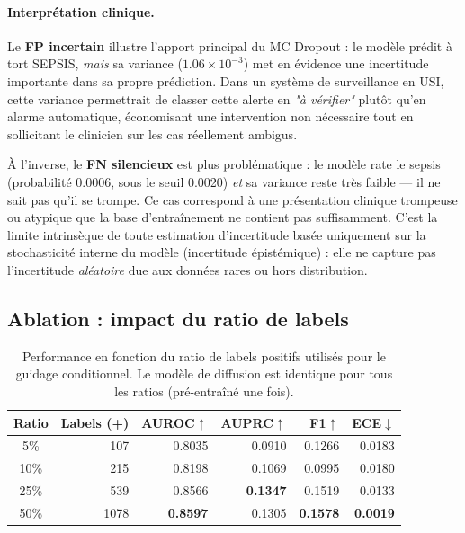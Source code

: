 \documentclass[11pt,a4paper]{article}
\begin{document}
\paragraph{Interprétation clinique.}
Le \textbf{FP incertain} illustre l'apport principal du MC Dropout : le modèle
prédit à tort SEPSIS, \emph{mais} sa variance ($1.06 \times 10^{-3}$) met en évidence une 
incertitude importante dans sa propre prédiction. Dans un système de surveillance
en USI, cette variance permettrait de classer cette alerte en \emph{"à vérifier"}
plutôt qu'en alarme automatique, économisant une intervention non nécessaire tout
en sollicitant le clinicien sur les cas réellement ambigus.

À l'inverse, le \textbf{FN silencieux} est plus problématique : le modèle rate
le sepsis (probabilité 0.0006, sous le seuil 0.0020) \emph{et} sa variance reste
très faible — il ne sait pas qu'il se trompe. Ce cas correspond à une présentation 
clinique trompeuse ou atypique que la base d'entraînement ne contient pas suffisamment. 
C'est la limite intrinsèque de toute estimation d'incertitude basée uniquement sur 
la stochasticité interne du modèle (incertitude épistémique) : elle ne capture pas 
l'incertitude \emph{aléatoire} due aux données rares ou hors distribution.

\subsection{Ablation : impact du ratio de labels}

\begin{table}[H]
\centering
\caption{Performance en fonction du ratio de labels positifs utilisés pour le guidage
conditionnel. Le modèle de diffusion est identique pour tous les ratios (pré-entraîné une fois).}
\renewcommand{\arraystretch}{1.3}
\begin{tabular}{crrrrr}
\toprule
\textbf{Ratio} & \textbf{Labels (+)} &
\textbf{AUROC}$\uparrow$ & \textbf{AUPRC}$\uparrow$ &
\textbf{F1}$\uparrow$ & \textbf{ECE}$\downarrow$ \\
\midrule
5\%  & 107  & 0.8035 & 0.0910 & 0.1266 & 0.0183 \\
10\%  & 215  & 0.8198 & 0.1069 & 0.0995 & 0.0180 \\
25\%  & 539 & 0.8566 & \textbf{0.1347} & 0.1519 & 0.0133 \\
50\%  & 1078 & \textbf{0.8597} & 0.1305 & \textbf{0.1578} & \textbf{0.0019} \\
\bottomrule
\end{tabular}
\end{table}
\end{document}
